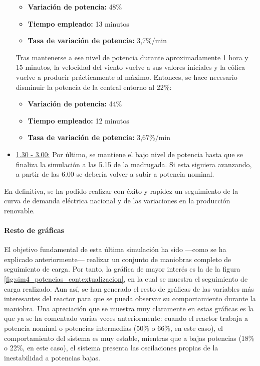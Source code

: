 \begin{itemize}
  \begin{itemize}
    \item \textbf{Variación de potencia:} 48\%
    \item \textbf{Tiempo empleado:} 13 minutos
    \item \textbf{Tasa de variación de potencia:} 3,7\%/min
  \end{itemize}
  Tras mantenerse a ese nivel de potencia durante aproximadamente 1 hora y 15 minutos, la velocidad del viento vuelve a sus valores iniciales y la eólica vuelve a producir prácticamente al máximo. Entonces, se hace necesario disminuir la potencia de la central entorno al 22\%:
  \begin{itemize}
    \item \textbf{Variación de potencia:} 44\%
    \item \textbf{Tiempo empleado:} 12 minutos
    \item \textbf{Tasa de variación de potencia:} 3,67\%/min
  \end{itemize}
  \item \underline{1.30 - 3.00:} Por último, se mantiene el bajo nivel de potencia hasta que se finaliza la simulación a las 5.15  de la madrugada. Si esta siguiera avanzando, a partir de las 6.00 se debería volver a subir a potencia nominal.
\end{itemize}

En definitiva, se ha podido realizar con éxito y rapidez un seguimiento de la curva de demanda eléctrica nacional y de las variaciones en la producción renovable.

\paragraph{Resto de gráficas}

El objetivo fundamental de esta última simulación ha sido ---como se ha explicado anteriormente--- realizar un conjunto de maniobras completo de seguimiento de carga. Por tanto, la gráfica de mayor interés es la de la figura \ref{fig:sim4_potencias_contextualizacion}, en la cual se muestra el seguimiento de carga realizado. Aun así, se han generado el resto de gráficas de las variables más interesantes del reactor para que se pueda observar su comportamiento durante la maniobra. Una apreciación que se muestra muy claramente en estas gráficas es la que ya se ha comentado varias veces anteriormente: cuando el reactor trabaja a potencia nominal o potencias intermedias (50\% o 66\%, en este caso), el comportamiento del sistema es muy estable, mientras que a bajas potencias (18\% o 22\%, en este caso), el sistema presenta las oscilaciones propias de la inestabilidad a potencias bajas.

